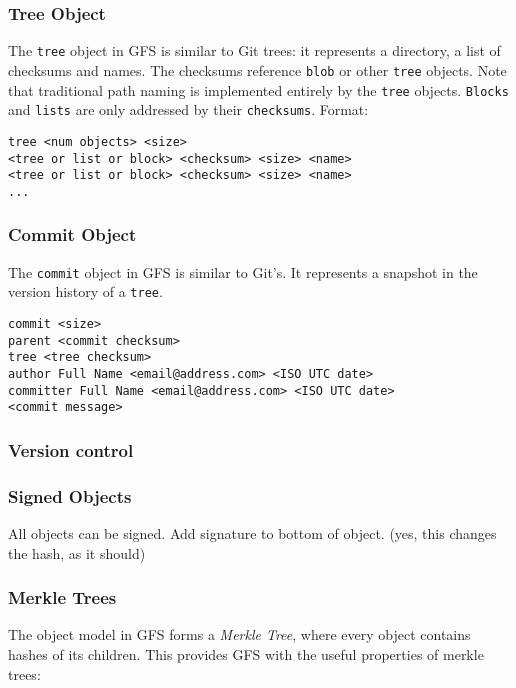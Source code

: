 \documentclass{sig-alternate}
\begin{document}
\subsubsection{Tree Object}

The \texttt{tree} object in GFS is similar to Git trees: it represents a
directory, a list of checksums and names. The checksums reference \texttt{blob}
or other \texttt{tree} objects. Note that traditional path naming
is implemented entirely by the \texttt{tree} objects. \texttt{Blocks} and
\texttt{lists} are only addressed by their \texttt{checksums}.
Format:
\begin{verbatim}
tree <num objects> <size>
<tree or list or block> <checksum> <size> <name>
<tree or list or block> <checksum> <size> <name>
...
\end{verbatim}

\subsubsection{Commit Object}

The \texttt{commit} object in GFS is similar to Git's. It represents a
snapshot in the version history of a \texttt{tree}.

\begin{verbatim}
commit <size>
parent <commit checksum>
tree <tree checksum>
author Full Name <email@address.com> <ISO UTC date>
committer Full Name <email@address.com> <ISO UTC date>
<commit message>
\end{verbatim}

\subsubsection{Version control}

\subsubsection{Signed Objects}

All objects can be signed. Add signature to bottom of object.
(yes, this changes the hash, as it should)

\subsubsection{Merkle Trees}

The object model in GFS forms a \textit{Merkle Tree}, where every object
contains hashes of its children. This provides GFS with the useful properties
of merkle trees:
\end{document}
